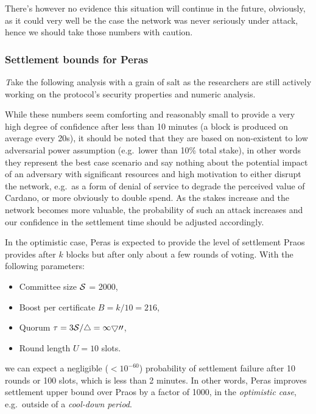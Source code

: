 \documentclass[10pt]{article}
\providecommand{\tightlist}{%
  \setlength{\itemsep}{0pt}\setlength{\parskip}{0pt}}
\begin{document}
There's however no evidence this situation will continue in the future,
obviously, as it could very well be the case the network was never
seriously under attack, hence we should take those numbers with caution.

\subsubsection{Settlement bounds for
Peras}\label{settlement-bounds-for-peras}

\begin{quoting}
{\emph Take the following analysis with a grain of salt as the researchers are
still actively working on the protocol's security properties and numeric
analysis.}
\end{quoting}

While these numbers seem comforting and reasonably small to provide a
very high degree of confidence after less than 10 minutes (a block is
produced on average every 20s), it should be noted that they are based
on non-existent to low adversarial power assumption (e.g.~lower than
10\% total stake), in other words they represent the best case scenario
and say nothing about the potential impact of an adversary with
significant resources and high motivation to either disrupt the network,
e.g.~as a form of denial of service to degrade the perceived value of
Cardano, or more obviously to double spend. As the stakes increase and
the network becomes more valuable, the probability of such an attack
increases and our confidence in the settlement time should be adjusted
accordingly.

In the optimistic case, Peras is expected to provide the level of
settlement Praos provides after \(k\) blocks but after only about a few
rounds of voting. With the following parameters:

\begin{itemize}
\tightlist
\item
  Committee size \(\cal{S}\) = 2000,
\item
  Boost per certificate \(B = k / 10 = 216\),
\item
  Quorum \(\tau = 3\cal{S} / 4 = 1500\),
\item
  Round length \(U = 10\) slots.
\end{itemize}

we can expect a negligible (\(< 10^{-60}\)) probability of settlement
failure after 10 rounds or 100 slots, which is less than 2 minutes. In
other words, Peras improves settlement upper bound over Praos by a
factor of 1000, in the \emph{optimistic case}, e.g.~outside of a
\emph{cool-down period}.
\end{document}
